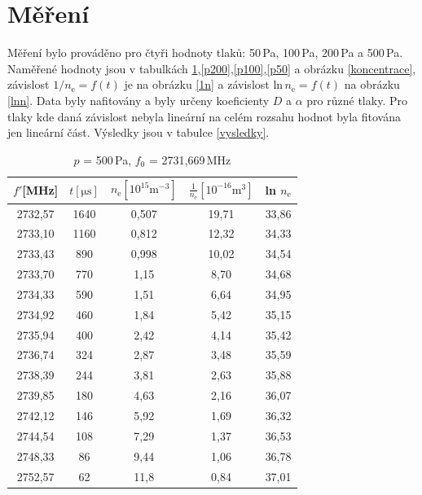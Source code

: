 \documentclass[12pt]{article}
\begin{document}
\section{Měření}
Měření bylo prováděno pro čtyři hodnoty tlaků: 50\,Pa, 100\,Pa, 200\,Pa a 500\,Pa. Naměřené hodnoty jsou v tabulkách \ref{p500},\ref{p200},\ref{p100},\ref{p50} a obrázku \ref{koncentrace}, závislost $1/n_\mathrm{e} = f(t)$ je na obrázku \ref{1n} a závislost $\mathrm{ln}\, n_\mathrm{e} = f(t)$ na obrázku \ref{lnn}.
Data byly nafitovány a byly určeny koeficienty $D$ a $\alpha$ pro různé tlaky. Pro tlaky kde daná závislost nebyla lineární na celém rozsahu hodnot byla fitována jen lineární část. Výsledky jsou v tabulce \ref{vysledky}.  

\begin{table}[htbp]
\begin{center}
\begin{tabular}{|c|c|c|c|c|}
\hline
$f'$[MHz] & $t[\mathrm{\mu s}]$ & $n_\mathrm{e}[10^{15}\mathrm{m}^{-3}]$ & $\frac{1}{n_\mathrm{e}} [10^{-16} \mathrm{m}^3]$ & ln $n_\mathrm{e}$ \\ \hline
2732,57 & 1640 & 0,507 & 19,71 & 33,86 \\ \hline
2733,10 & 1160 & 0,812 & 12,32 & 34,33 \\ \hline
2733,43 & 890 & 0,998 & 10,02 & 34,54 \\ \hline
2733,70 & 770 & 1,15 & 8,70 & 34,68 \\ \hline
2734,33 & 590 & 1,51 & 6,64 & 34,95 \\ \hline
2734,92 & 460 & 1,84 & 5,42 & 35,15 \\ \hline
2735,94 & 400 & 2,42 & 4,14 & 35,42 \\ \hline
2736,74 & 324 & 2,87 & 3,48 & 35,59 \\ \hline
2738,39 & 244 & 3,81 & 2,63 & 35,88 \\ \hline
2739,85 & 180 & 4,63 & 2,16 & 36,07 \\ \hline
2742,12 & 146 & 5,92 & 1,69 & 36,32 \\ \hline
2744,54 & 108 & 7,29 & 1,37 & 36,53 \\ \hline
2748,33 & 86 & 9,44 & 1,06 & 36,78 \\ \hline
2752,57 & 62 & 11,8 & 0,84 & 37,01 \\ \hline
\end{tabular}
\caption{$p$ = 500\,Pa, $f_0$ = 2731,669\,MHz}
\label{p500}
\end{center}
\end{table}
\end{document}
